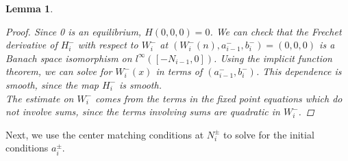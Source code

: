 \documentclass[12pt]{article}
\newtheorem{lemma}{Lemma}
\begin{document}
\begin{lemma}
\begin{proof}
Since 0 is an equilibrium, $H(0, 0, 0) = 0$. We can check that the Frechet derivative of $H_i^-$ with respect to $W_i^-$ at $(W_i^-(n), a_{i-1}^-, b_i^-) = (0, 0, 0)$ is a Banach space isomorphism on $l^\infty([-N_{i-1}, 0])$. Using the implicit function theorem, we can solve for $W_i^-(x)$ in terms of $(a_{i-1}^-, b_i^-)$. This dependence is smooth, since the map $H_i^-$ is smooth. \\

The estimate on $W_i^-$ comes from the terms in the fixed point equations which do not involve sums, since the terms involving sums are quadratic in $W_i^-$. 
\end{proof}
\end{lemma}

Next, we use the center matching conditions at $N_i^\pm$ to solve for the initial conditions $a_i^\pm$.

\end{document}
